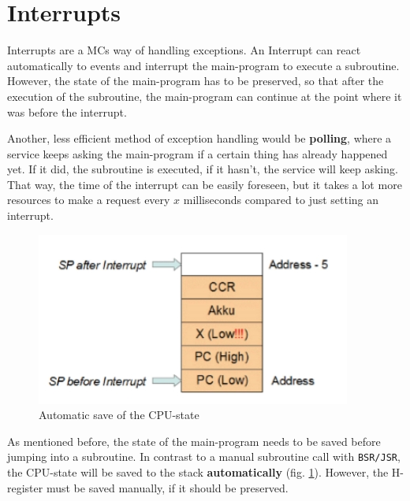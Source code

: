 \documentclass[a4paper, 11pt, nofootinbib]{article}
\newcommand{\code}[1]{\texttt{#1}}
\begin{document}
\section{Interrupts}
Interrupts are a MCs way of handling exceptions. An Interrupt can react automatically to events and interrupt the main-program to execute a subroutine. However, the state of the main-program has to be preserved, so that after the execution of the subroutine, the main-program can continue at the point where it was before the interrupt. 

\vspace{10px}

\noindent Another, less efficient method of exception handling would be \textbf{polling}, where a service keeps asking the main-program if a certain thing has already happened yet. If it did, the subroutine is executed, if it hasn't, the service will keep asking. That way, the time of the interrupt can be easily foreseen, but it takes a lot more resources to make a request every $x$ milliseconds compared to just setting an interrupt.

\begin{figure}
	\centering
	\includegraphics[keepaspectratio=true,height=10\baselineskip]{save_interrupt.jpg}
	\caption{Automatic save of the CPU-state}
	\label{fig:saveInterrupt}
\end{figure}

\vspace{10px}

\noindent As mentioned before, the state of the main-program needs to be saved before jumping into a subroutine. In contrast to a manual subroutine call with \code{BSR/JSR}, the CPU-state will be saved to the stack \textbf{automatically} (fig. \ref{fig:saveInterrupt}). However, the H-register must be saved manually, if it should be preserved.

\vspace{10px}
\end{document}
